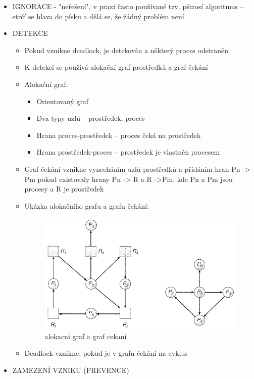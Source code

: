 \documentclass[10pt,a4paper]{article}
\begin{document}
\begin{itemize}
	\item IGNORACE - "neřešení", v praxi často používané tzv. pštrosí algoritmus – strčí se hlava do písku a dělá se, že žádný problém není
	\item DETEKCE
	\begin{itemize}
		\item Pokud vznikne deadlock, je detekován a některý proces odstraněn
		\item K detekci se používá alokační graf prostředků a graf čekání
		\item Alokační graf:
		\begin{itemize}
			\item Orientovaný graf
			\item Dva typy uzlů – prostředek, proces
			\item Hrana proces-prostředek – proces čeká na prostředek
			\item Hrana prostředek-proces – prostředek je vlastněn procesem
		\end{itemize}
		\item Graf čekání vznikne vynecháním uzlů prostředků a přidáním hran Pn -> Pm pokud existovaly hrany Pn -> R a R ->Pm, kde Pn a Pm jsou procesy a R je prostředek
		\item Ukázka alokačního grafu a grafu čekání:
		\begin{figure} [h]
			\includegraphics[scale=0.8]{img/alokacni_graf_a_graf_cekani.png}
			\caption{alokacni graf a graf cekani}
		\end{figure}
		\item Deadlock vznikne, pokud je v grafu čekání na cyklus
	\end{itemize}
	\item ZAMEZENÍ VZNIKU (PREVENCE)
	\begin{itemize}

\end{itemize}
\end{itemize}
\end{document}
